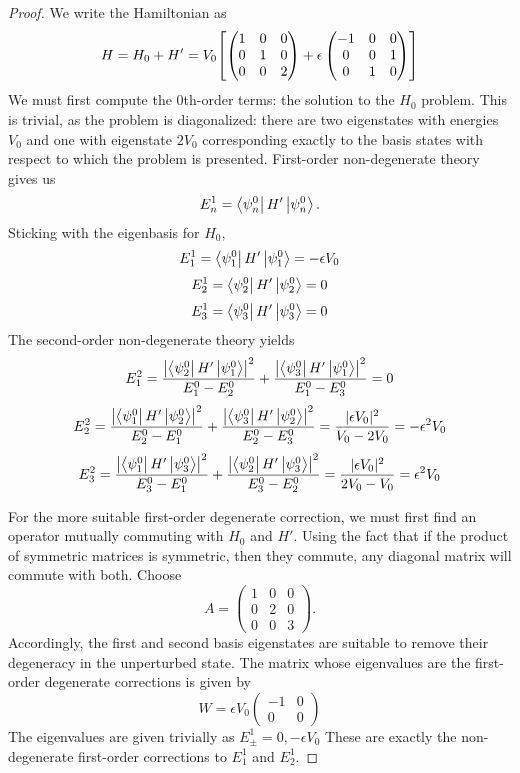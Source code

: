 \documentclass{article}
\begin{document}
\begin{proof}
  We write the Hamiltonian as
  \[
    H = H_{0} + H' = V_{0}\qty[
    \begin{pmatrix}
      1 & 0 & 0 \\
      0 & 1 & 0 \\
      0 & 0 & 2
    \end{pmatrix}
    +
    \epsilon
    \begin{pmatrix}
      -1 & 0 & 0 \\
      0 & 0 & 1 \\
      0 & 1 & 0
    \end{pmatrix}
    ]
  \]
  We must first compute the 0th-order terms: the solution to the $H_{0}$ problem.
  This is trivial, as the problem is diagonalized: there are two eigenstates with energies $V_{0}$ and one with eigenstate $2V_{0}$
  corresponding exactly to the basis states with respect to which the problem is presented.
  First-order non-degenerate theory gives us
  \[
    E_{n}^{1} = \bra{\psi_{n}^{0}}H'\ket{\psi_{n}^{0}}.
  \]
  Sticking with the eigenbasis for $H_{0}$,
  \[
    E_{1}^{1} = \bra{\psi_{1}^{0}}H'\ket{\psi_{1}^{0}} = -\epsilon V_{0}
  \]
  \[
    E_{2}^{1} = \bra{\psi_{2}^{0}}H'\ket{\psi_{2}^{0}} = 0
  \]
  \[
    E_{3}^{1} = \bra{\psi_{3}^{0}}H'\ket{\psi_{3}^{0}} = 0
  \]
  The second-order non-degenerate theory yields
  \[
    E_{1}^{2} = \frac{\qty|\bra{\psi_{2}^{0}}H'\ket{\psi_{1}^{0}}|^{2}}{E_{1}^{0} - E_{2}^{0}}
    + \frac{\qty|\bra{\psi_{3}^{0}}H'\ket{\psi_{1}^{0}}|^{2}}{E_{1}^{0} - E_{3}^{0}}
    = 0
  \]
  \[
    E_{2}^{2} = \frac{\qty|\bra{\psi_{1}^{0}}H'\ket{\psi_{2}^{0}}|^{2}}{E_{2}^{0} - E_{1}^{0}}
    + \frac{\qty|\bra{\psi_{3}^{0}}H'\ket{\psi_{2}^{0}}|^{2}}{E_{2}^{0} - E_{3}^{0}}
    = \frac{|\epsilon V_{0}|^{2}}{V_{0} - 2V_{0}}
    = -{\epsilon^{2} V_{0}}
  \]
  \[
    E_{3}^{2} = \frac{\qty|\bra{\psi_{1}^{0}}H'\ket{\psi_{3}^{0}}|^{2}}{E_{3}^{0} - E_{1}^{0}}
    + \frac{\qty|\bra{\psi_{2}^{0}}H'\ket{\psi_{3}^{0}}|^{2}}{E_{3}^{0} - E_{2}^{0}}
    = \frac{|\epsilon V_{0}|^{2}}{2V_{0} - V_{0}}
    = \epsilon^{2}V_{0}
  \]

  For the more suitable first-order degenerate correction, we must first find an operator mutually commuting with $H_{0}$ and $H'$.
  Using the fact that if the product of symmetric matrices is symmetric, then they commute, any diagonal matrix will commute with both.
  Choose
  \[
    A =
    \begin{pmatrix}
      1 & 0 & 0 \\
      0 & 2 & 0 \\
      0 & 0 & 3
    \end{pmatrix}.
  \]
  Accordingly, the first and second basis eigenstates are suitable to remove their degeneracy in the unperturbed state.
  The matrix whose eigenvalues are the first-order degenerate corrections is given by
  \[
    W =
    \epsilon V_{0}
    \begin{pmatrix}
      -1 & 0 \\
      0 & 0
    \end{pmatrix}
  \]
  The eigenvalues are given trivially as $E_{\pm}^{1} = 0, -\epsilon V_{0}$
  These are exactly the non-degenerate first-order corrections to $E_{1}^{1}$ and $E_{2}^{1}$.
\end{proof}
\end{document}
